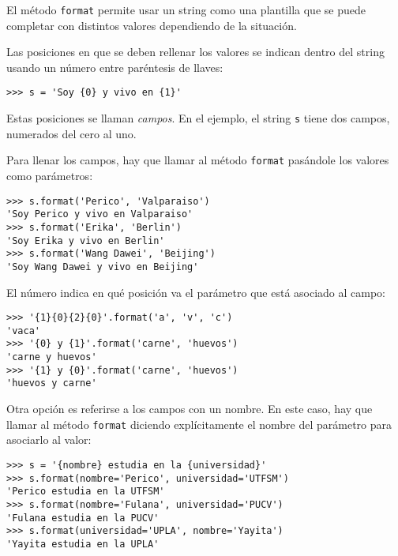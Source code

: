 El método \lstinline!format! permite usar un string como una plantilla
que se puede completar con distintos valores dependiendo de la
situación.

Las posiciones en que se deben rellenar los valores se indican dentro
del string usando un número entre paréntesis de llaves:

\begin{lstlisting}
>>> s = 'Soy {0} y vivo en {1}'
\end{lstlisting}

Estas posiciones se llaman \emph{campos}. En el ejemplo, el string
\lstinline!s! tiene dos campos, numerados del cero al uno.

Para llenar los campos, hay que llamar al método \lstinline!format!
pasándole los valores como parámetros:

\begin{lstlisting}
>>> s.format('Perico', 'Valparaiso')
'Soy Perico y vivo en Valparaiso'
>>> s.format('Erika', 'Berlin')
'Soy Erika y vivo en Berlin'
>>> s.format('Wang Dawei', 'Beijing')
'Soy Wang Dawei y vivo en Beijing'
\end{lstlisting}

El número indica en qué posición va el parámetro que está asociado al
campo:

\begin{lstlisting}
>>> '{1}{0}{2}{0}'.format('a', 'v', 'c')
'vaca'
>>> '{0} y {1}'.format('carne', 'huevos')
'carne y huevos'
>>> '{1} y {0}'.format('carne', 'huevos')
'huevos y carne'
\end{lstlisting}

Otra opción es referirse a los campos con un nombre. En este caso, hay
que llamar al método \lstinline!format! diciendo explícitamente el
nombre del parámetro para asociarlo al valor:

\begin{lstlisting}
>>> s = '{nombre} estudia en la {universidad}'
>>> s.format(nombre='Perico', universidad='UTFSM')
'Perico estudia en la UTFSM'
>>> s.format(nombre='Fulana', universidad='PUCV')
'Fulana estudia en la PUCV'
>>> s.format(universidad='UPLA', nombre='Yayita')
'Yayita estudia en la UPLA'
\end{lstlisting}


